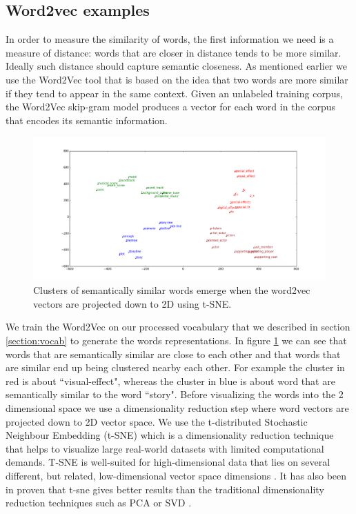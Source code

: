 \documentclass{article}
\begin{document}
\subsection{Word2vec examples}
In order to measure the similarity of words, the first information we need is a measure of distance: words that are closer in distance tends to be more similar. Ideally such distance should capture semantic closeness. As mentioned earlier we use the Word2Vec tool that is based on the idea that two words are more similar if they tend to appear in the same context. Given an unlabeled training corpus, the Word2Vec skip-gram model produces a vector for each word in the corpus that encodes its semantic information. 
 


\begin{figure}
 \begin{center}
 \includegraphics[scale=0.3]{tsne_clusters2.png} 
 \caption{Clusters of semantically similar words emerge when the
word2vec vectors are projected down to 2D using t-SNE. } 
  \label{w2vecclusters}
  \end{center}
 \end{figure}


We train the Word2Vec on our processed vocabulary that we described in section \ref{section:vocab} to generate the words representations. In figure \ref{w2vecclusters}  we can see that words that are semantically similar are close to each other and that words that are similar end up being clustered nearby each other. For example the cluster in red is about ``visual-effect", whereas the cluster in blue is about word that are semantically similar to the word ``story".
Before visualizing the words into the 2 dimensional space we use a dimensionality reduction step where word vectors are projected down to 2D vector space. We use the t-distributed Stochastic Neighbour Embedding (t-SNE) which is a dimensionality reduction technique that helps to visualize large real-world datasets with limited computational demands. T-SNE is well-suited for high-dimensional data that lies on several different, but related, low-dimensional vector space dimensions \cite{tsne:2008}. It has also been in \cite{tsne:2008} proven that t-sne gives better results than the traditional dimensionality reduction techniques such as PCA \cite{pca:1987} or SVD \cite{svd:1936}.
\end{document}
